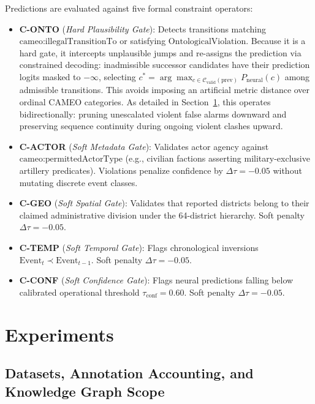 \documentclass[11pt,a4paper]{article}
\begin{document}
Predictions are evaluated against five formal constraint operators:
\begin{itemize}
  \item \textbf{C-ONTO} (\textit{Hard Plausibility Gate}): Detects transitions matching $\text{cameo:illegalTransitionTo}$ or satisfying $\text{OntologicalViolation}$. Because it is a hard gate, it intercepts unplausible jumps and re-assigns the prediction via constrained decoding: inadmissible successor candidates have their prediction logits masked to $-\infty$, selecting $c^* = \arg\max_{c \in \mathcal{C}_{\text{valid}}(\text{prev})} P_{\text{neural}}(c)$ among admissible transitions. This avoids imposing an artificial metric distance over ordinal CAMEO categories. As detailed in Section~\ref{sec:experiments}, this operates bidirectionally: pruning unescalated violent false alarms downward and preserving sequence continuity during ongoing violent clashes upward.
  \item \textbf{C-ACTOR} (\textit{Soft Metadata Gate}): Validates actor agency against $\text{cameo:permittedActorType}$ (e.g., civilian factions asserting military-exclusive artillery predicates). Violations penalize confidence by $\Delta \tau = -0.05$ without mutating discrete event classes.
  \item \textbf{C-GEO} (\textit{Soft Spatial Gate}): Validates that reported districts belong to their claimed administrative division under the 64-district hierarchy. Soft penalty $\Delta \tau = -0.05$.
  \item \textbf{C-TEMP} (\textit{Soft Temporal Gate}): Flags chronological inversions $\text{Event}_t \prec \text{Event}_{t-1}$. Soft penalty $\Delta \tau = -0.05$.
  \item \textbf{C-CONF} (\textit{Soft Confidence Gate}): Flags neural predictions falling below calibrated operational threshold $\tau_{\text{conf}} = 0.60$. Soft penalty $\Delta \tau = -0.05$.
\end{itemize}

\section{Experiments}
\label{sec:experiments}

\subsection{Datasets, Annotation Accounting, and Knowledge Graph Scope}
\end{document}
